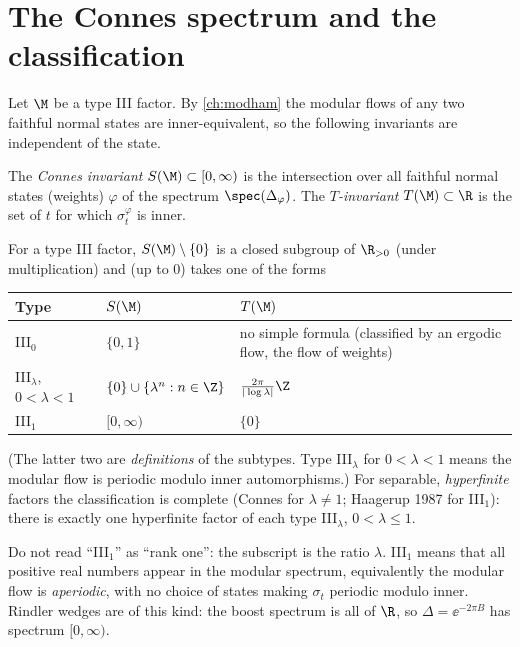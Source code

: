 \section{The Connes spectrum and the classification}

Let $\M$ be a type III factor. By \cref{ch:modham} the modular flows of any two faithful normal states are inner-equivalent, so the following invariants are independent of the state.

\begin{definition}
The \emph{Connes invariant} $S(\M)\subset[0,\infty)$ is the intersection over all faithful normal states (weights) $\varphi$ of the spectrum $\spec(\Delta_\varphi)$. The \emph{$T$-invariant} $T(\M)\subset\R$ is the set of $t$ for which $\sigma^\varphi_t$ is inner.
\end{definition}

\begin{theorem}[Connes]
For a type III factor, $S(\M)\setminus\{0\}$ is a closed subgroup of $\R_{>0}$ (under multiplication) and (up to $0$) takes one of the forms
\begin{center}
\renewcommand{\arraystretch}{1.3}
\begin{tabular}{@{}lll@{}}
\toprule
Type & $S(\M)$ & $T(\M)$\\
\midrule
III$_0$ & $\{0,1\}$ & no simple formula (classified by an ergodic flow, the flow of weights)\\
III$_\lambda$, $0<\lambda<1$ & $\{0\}\cup\{\lambda^n:n\in\Z\}$ & $\frac{2\pi}{|\log\lambda|}\Z$\\
III$_1$ & $[0,\infty)$ & $\{0\}$\\
\bottomrule
\end{tabular}
\end{center}
\end{theorem}
(The latter two are \emph{definitions} of the subtypes. Type III$_\lambda$ for $0<\lambda<1$ means the modular flow is periodic modulo inner automorphisms.) For separable, \emph{hyperfinite} factors the classification is complete (Connes for $\lambda\ne1$; Haagerup 1987 for III$_1$): there is exactly one hyperfinite factor of each type III$_\lambda$, $0<\lambda\le1$.

\begin{whatwrong}
Do not read ``III$_1$'' as ``rank one'': the subscript is the ratio $\lambda$. III$_1$ means that all positive real numbers appear in the modular spectrum, equivalently the modular flow is \emph{aperiodic}, with no choice of states making $\sigma_t$ periodic modulo inner. Rindler wedges are of this kind: the boost spectrum is all of $\R$, so $\Delta=\ee^{-2\pi B}$ has spectrum $[0,\infty)$.
\end{whatwrong}

